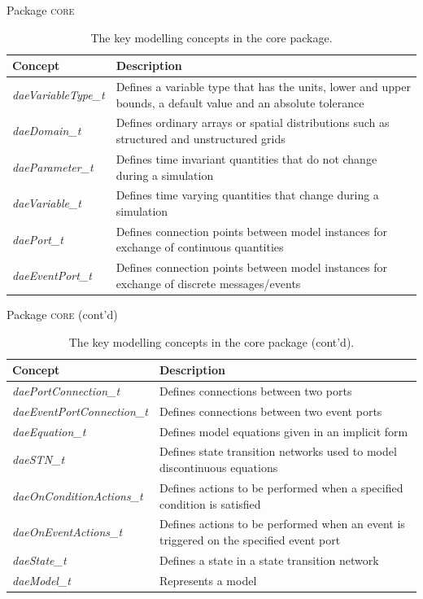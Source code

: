 \documentclass[compress,newPxFont,sthlmFooter]{beamer}
\begin{document}
\begin{frame}{Package \textsc{core}}
\scriptsize
{
\begin{table}
  \caption{The key modelling concepts in the \alert{core} package.}
  \begin{tabularx}{\linewidth}{l>{\raggedright}X}
    \toprule
    \textcolor{sthlmRed}{\textbf{Concept}} & \textcolor{sthlmRed}{\textbf{Description}} \tabularnewline
    \midrule
    \textcolor{sthlmRed}{\textit{daeVariableType\_t}} & Defines a variable type that has the units, lower and upper bounds, a default value and 
                                  an absolute tolerance \tabularnewline
    \textcolor{sthlmRed}{\textit{daeDomain\_t}} & Defines ordinary arrays or spatial distributions such as structured and unstructured grids \tabularnewline 
    \textcolor{sthlmRed}{\textit{daeParameter\_t}} & Defines time invariant quantities that do not change during a simulation \tabularnewline 
    \textcolor{sthlmRed}{\textit{daeVariable\_t}} & Defines time varying quantities that change during a simulation \tabularnewline 
    \textcolor{sthlmRed}{\textit{daePort\_t}} & Defines connection points between model instances for exchange of continuous quantities \tabularnewline 
    \textcolor{sthlmRed}{\textit{daeEventPort\_t}} & Defines connection points between model instances for exchange of discrete messages/events \tabularnewline
    \bottomrule
  \end{tabularx}
\end{table}
}
\end{frame}

\begin{frame}{Package \textsc{core} (cont'd)}
\scriptsize
{
\begin{table}
  \caption{The key modelling concepts in the \alert{core} package (cont'd).}
  \begin{tabularx}{\linewidth}{l>{\raggedright}X}
    \toprule
    \textcolor{sthlmRed}{\textbf{Concept}} & \textcolor{sthlmRed}{\textbf{Description}} \tabularnewline
    \midrule
    \textcolor{sthlmRed}{\textit{daePortConnection\_t}} & Defines connections between two ports \tabularnewline 
    \textcolor{sthlmRed}{\textit{daeEventPortConnection\_t}} & Defines connections between two event ports \tabularnewline
    \textcolor{sthlmRed}{\textit{daeEquation\_t}} & Defines model equations given in an implicit form \tabularnewline 
    \textcolor{sthlmRed}{\textit{daeSTN\_t}} & Defines state transition networks used to model discontinuous equations \tabularnewline
    \textcolor{sthlmRed}{\textit{daeOnConditionActions\_t}} & Defines actions to be performed when a specified condition is satisfied \tabularnewline
    \textcolor{sthlmRed}{\textit{daeOnEventActions\_t}} & Defines actions to be performed when an event is triggered on the specified event port \tabularnewline
    \textcolor{sthlmRed}{\textit{daeState\_t}} & Defines a state in a state transition network \tabularnewline 
    \textcolor{sthlmRed}{\textit{daeModel\_t}} & Represents a model \tabularnewline
    \bottomrule
  \end{tabularx}
\end{table}
}
\end{frame}
\end{document}
